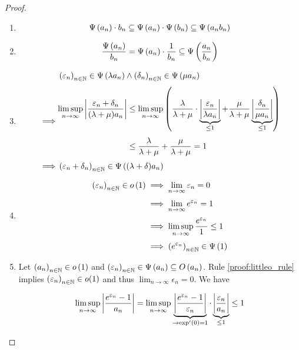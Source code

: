 \begin{proof}
\begin{enumerate}
    \item

      \begin{align}
        \Psi\left( {a_n} \right) \cdot b_n \subseteq \Psi\left( {a_n} \right) \cdot \Psi\left( {b_n} \right) \subseteq \Psi\left( {a_n b_n} \right)
      \end{align}

    \item

      \begin{align}
        \frac{\Psi\left( {a_n} \right)}{b_n} = \Psi\left( {a_n} \right) \cdot \frac{1}{b_n} \subseteq \Psi\left( {\frac{a_n}{b_n}} \right)
      \end{align}

    \item

      \begin{align}
        & \seq{\epsilon_n} \in \bigpsi{\lambda a_n} \land \seq{\delta_n} \in \bigpsi{\mu a_n} \nl
        \implies &
        \begin{aligned}
          \limsup_{n\to\infty} \abs{\frac{\epsilon_n+\delta_n}{(\lambda+\mu)a_n}} & \le \limsup_{n\to\infty} \left( \frac{\lambda}{\lambda + \mu} \cdot \underbrace{\abs{\frac{\epsilon_n}{\lambda a_n}}}_{\le 1} + \frac{\mu}{\lambda + \mu} \underbrace{\abs{\frac{\delta_n}{\mu a_n}}}_{\le 1} \right) \nl
          &\le \frac{\lambda}{\lambda+\mu} + \frac{\mu}{\lambda+\mu} = 1
        \end{aligned} \nl
        \implies & \seq{\epsilon_n+\delta_n} \in \bigpsi{(\lambda+\delta)a_n}
      \end{align}
    \item

      \begin{align}
        \seq{\epsilon_n} \in \littleo{1} & \implies \lim_{n\to\infty} \epsilon_n = 0 \nl
        & \implies \lim_{n\to\infty} e^{\epsilon_n} = 1 \nl
        & \implies \limsup_{n\to\infty} \frac{e^{\epsilon_n}}{1} \le 1 \nl
        & \implies \seq{e^{\epsilon_n}} \in \bigpsi{1}
      \end{align}

    \item

      Let $\left({a_n}\right)_{{n}\in\mathbb N}\in o\left( {1} \right)$ and $\left({\varepsilon_n}\right)_{{n}\in\mathbb N}\in\Psi\left( {a_n} \right)\subseteq O\left( {a_n} \right)$. Rule \ref{proof:littleo_rule} implies $\left({\varepsilon_n}\right)_{{n}\in\mathbb N} \in o(1)$ and thus $\lim_{n\to\infty} \epsilon_n = 0$. We have

      \begin{align}
        \limsup_{n\to\infty} \left|{\frac{e^{\varepsilon_n}-1}{a_n}}\right| = \limsup_{n\to\infty} \underbrace{\left|{\frac{e^{\varepsilon_n}-1}{\varepsilon_n}}\right|}_{\to \exp'(0)=1} \cdot \underbrace{\left|{\frac{\varepsilon_n}{a_n}}\right|}_{\le 1} \le 1
      \end{align}


\end{enumerate}
\end{proof}
